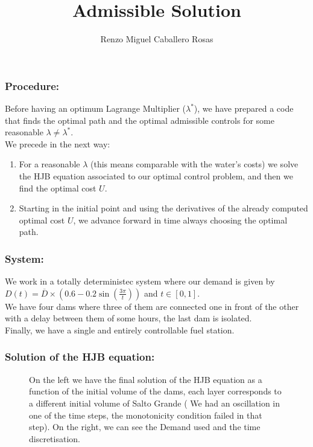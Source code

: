 \documentclass[aspectratio=169]{beamer}\usepackage[utf8]{inputenc}
\title{Admissible Solution}
\subtitle{Renzo Miguel Caballero Rosas}
\begin{document}
\begin{frame}
\titlepage
\end{frame}

\begin{frame}\frametitle{Procedure:}
Before having an optimum Lagrange Multiplier ($\lambda^*$), we have prepared a code that finds the optimal path and the optimal admissible controls for some reasonable $\lambda\neq\lambda^*$.\\
We precede in the next way:
\begin{enumerate}
\item For a reasonable $\lambda$ (this means comparable with the water's costs) we solve the HJB equation associated to our optimal control problem, and then we find the optimal cost $U$.
\item Starting in the initial point and using the derivatives of the already computed optimal cost $U$, we advance forward in time always choosing the optimal path.
\end{enumerate}
\end{frame}

\begin{frame}\frametitle{System:}
We work in a totally deterministec system where our demand is given by $D(t)=\overline{D}\times(0.6-0.2\sin(\frac{3\pi}{t}))$ and $t\in[0,1]$.\\
We have four dams where three of them are connected one in front of the other with a delay between them of some hours, the last dam is isolated.\\
Finally, we have a single and entirely controllable fuel station.
\end{frame}

\begin{frame}\frametitle{Solution of the HJB equation:}
\begin{figure}[ht!]
\centering
{}
\caption{On the left we have the final solution of the HJB equation as a function of the initial volume of the dams, each layer corresponds to a different initial volume of Salto Grande ({\color[rgb]{1,0,0} We had an oscillation in one of the time steps, the monotonicity condition failed in that step}). On the right, we can see the Demand used and the time discretisation.}
\end{figure}
\end{frame}
\end{document}
